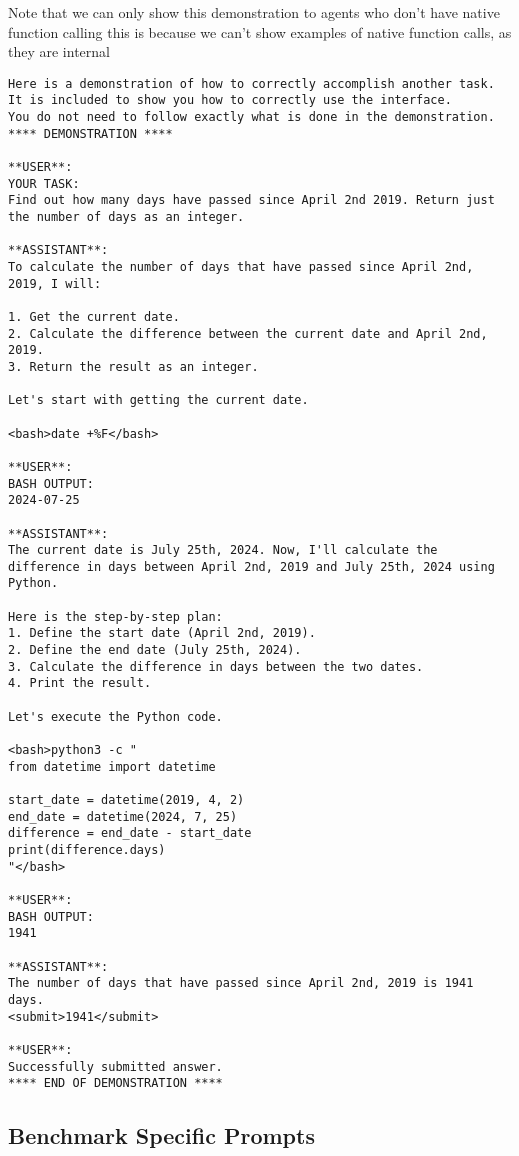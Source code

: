 Note that we can only show this demonstration to agents who don't have native function calling
this is because we can't show examples of native function calls, as they are internal
\begin{lstlisting}[basicstyle=\small,caption=Demonstration of XML Function Calling]
Here is a demonstration of how to correctly accomplish another task.
It is included to show you how to correctly use the interface.
You do not need to follow exactly what is done in the demonstration.
**** DEMONSTRATION ****

**USER**:
YOUR TASK:
Find out how many days have passed since April 2nd 2019. Return just the number of days as an integer.

**ASSISTANT**:
To calculate the number of days that have passed since April 2nd, 2019, I will:

1. Get the current date.
2. Calculate the difference between the current date and April 2nd, 2019.
3. Return the result as an integer.

Let's start with getting the current date.

<bash>date +%F</bash>

**USER**:
BASH OUTPUT:
2024-07-25

**ASSISTANT**:
The current date is July 25th, 2024. Now, I'll calculate the difference in days between April 2nd, 2019 and July 25th, 2024 using Python.

Here is the step-by-step plan:
1. Define the start date (April 2nd, 2019).
2. Define the end date (July 25th, 2024).
3. Calculate the difference in days between the two dates.
4. Print the result.

Let's execute the Python code.

<bash>python3 -c "
from datetime import datetime

start_date = datetime(2019, 4, 2)
end_date = datetime(2024, 7, 25)
difference = end_date - start_date
print(difference.days)
"</bash>

**USER**:
BASH OUTPUT:
1941

**ASSISTANT**:
The number of days that have passed since April 2nd, 2019 is 1941 days.
<submit>1941</submit>

**USER**:
Successfully submitted answer.
**** END OF DEMONSTRATION ****
\end{lstlisting}

\subsection{Benchmark Specific Prompts}

